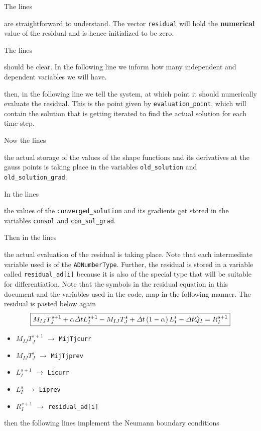 \documentclass[preprint,12pt]{elsarticle}
\newcommand{\te}[1]{\lstinline{#1}}
\numberwithin{equation}{section}
\begin{document}
The lines

are straightforward to understand. The vector \te{residual} will hold the \textbf{numerical} value of the residual and is hence initialized to be zero. 

The lines

should be clear. In the following line we inform how many independent and dependent variables we will have. 

then, in the following line we tell the system, at which point it should numerically evaluate the residual. This is the point given by \te{evaluation_point}, which will contain the solution that is getting iterated to find the actual solution for each time step.


Now the lines

the actual storage of the values of the shape functions and its derivatives at the gauss points is taking place in the variables \te{old_solution} and \te{old_solution_grad}. 

In the lines 

the values of the \te{converged_solution} and its gradients get stored in the variables \te{consol} and \te{con_sol_grad}.

Then in the lines

the actual evaluation of the residual is taking place. Note that each intermediate variable used is of the \te{ADNumberType}. Further, the residual is stored in a variable called \te{residual_ad[i]} because it is also of the special type that will be suitable for differentiation. Note that the symbols in the residual equation in this document and the variables used in the code, map in the following manner. The residual is pasted below again
\begin{equation}
	\boxed{
		M_{IJ}T_{J}^{s+1} +	\alpha \Delta t L_I^{s+1}  - M_{IJ}T_{J}^s + \Delta t \left( 1-\alpha \right) L_I^s - \Delta t Q_I = R_I^{s+1}
	}
	\label{eq:finaleq2}
\end{equation}
\begin{itemize}
	\item $M_{IJ}T_{J}^{s+1}$ $\rightarrow$ \te{MijTjcurr}
	\item $M_{IJ}T_{J}^{s}$ $\rightarrow$ \te{MijTjprev}
	\item $L_I^{s+1}$ $\rightarrow$ \te{Licurr}
	\item $L_I^{s}$ $\rightarrow$ \te{Liprev}
	\item $R_I^{s+1}$ $\rightarrow$ \te{residual_ad[i]}
\end{itemize}
then the following lines implement the Neumann boundary conditions

\end{document}
